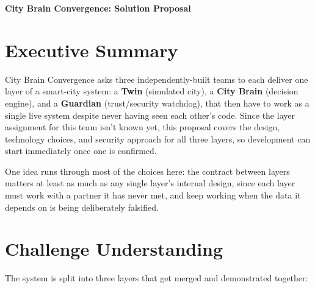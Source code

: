\documentclass[10pt,letterpaper]{article}
\begin{document}
\begin{center}
{\Large \textbf{City Brain Convergence: Solution Proposal}}
\end{center}

\vspace{0.2cm}

\section{Executive Summary}

City Brain Convergence asks three independently-built teams to each deliver one layer of a smart-city system: a \textbf{Twin} (simulated city), a \textbf{City Brain} (decision engine), and a \textbf{Guardian} (trust/security watchdog), that then have to work as a single live system despite never having seen each other's code. Since the layer assignment for this team isn't known yet, this proposal covers the design, technology choices, and security approach for all three layers, so development can start immediately once one is confirmed.

One idea runs through most of the choices here: the contract between layers matters at least as much as any single layer's internal design, since each layer must work with a partner it has never met, and keep working when the data it depends on is being deliberately falsified.

\section{Challenge Understanding}

The system is split into three layers that get merged and demonstrated together:
\end{document}

